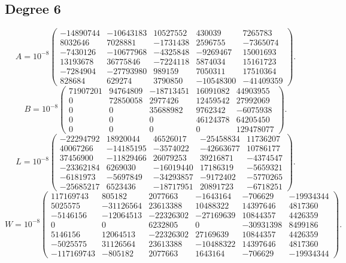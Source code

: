 \documentclass[11pt]{article}
\begin{document}
\subsection*{Degree 6}
\[
 A=10^{-8}\left(\begin{array}{rrrrr}
-14890744&-10643183&10527552&430039&7265783\\
8032646&7028881&-1731438&2596755&-7365074\\
-7430126&-10677968&-4325848&-9269467&15001693\\
13193678&36775846&-7224118&5874034&15161723\\
-7284904&-27793980&989159&7050311&17510364\\
828684&629274&3790850&-10548300&-41409359
\end{array}\right).
\]
\[
 B=10^{-8}\left(\begin{array}{rrrrr}
71907201&94764809&-18713451&16091082&44903955\\
0&72850058&2977426&12459542&27992069\\
0&0&35688982&9762342&-6075938\\
0&0&0&46124378&64205450\\
0&0&0&0&129478077
\end{array}\right).
\]
\[
 L=10^{-8}\left(\begin{array}{rrrrr}
-22294792&18920044&46526017&-25458834&11736207\\
40067266&-14185195&-3574022&-42663677&10786177\\
37456900&-11829466&26079253&39216871&-4374547\\
-23362184&6269030&-16019440&17186319&-5659321\\
-6181973&-5697849&-34293857&-9172402&-5770265\\
-25685217&6523436&-18717951&20891723&-6718251
\end{array}\right).
\]
\[
 W=10^{-8}\left(\begin{array}{rrrrrr}
117169743&805182&2077663&-1643164&-706629&-19934344\\
5025575&-31126564&23613388&10488322&14397646&4817360\\
-5146156&-12064513&-22326302&-27169639&10844357&4426359\\
0&0&6232805&0&-30931398&8499186\\
5146156&12064513&-22326302&27169639&10844357&4426359\\
-5025575&31126564&23613388&-10488322&14397646&4817360\\
-117169743&-805182&2077663&1643164&-706629&-19934344
\end{array}\right).
\]
\end{document}
